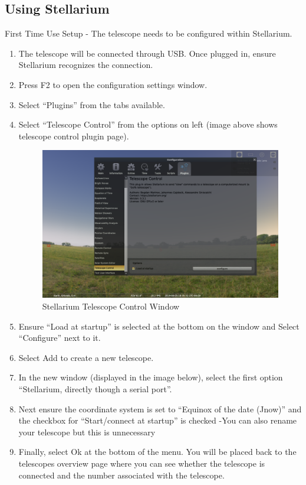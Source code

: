 \documentclass[12pt]{report}
\begin{document}
\subsection{Using Stellarium}

First Time Use Setup - The telescope needs to be configured within Stellarium.
\begin{enumerate}
\item The telescope will be connected through USB. Once plugged in, ensure Stellarium recognizes the connection.
\item Press F2 to open the configuration settings window.
\item Select “Plugins” from the tabs available.
\item Select “Telescope Control” from the options on left (image above shows telescope control plugin page).

\begin{figure}[h]
	\centering
	\includegraphics[width=0.75\linewidth]{stellTeleWindow}
	\caption{Stellarium Telescope Control Window}
  \label{fig:stellTeleWindow}
\end{figure}

\item Ensure “Load at startup” is selected at the bottom on the window and Select “Configure” next to it.
\item Select Add to create a new telescope.
\item In the new window (displayed in the image below), select the first option “Stellarium, directly though a serial port”.
\item Next ensure the coordinate system is set to “Equinox of the date (Jnow)” and the checkbox for “Start/connect at startup” is checked
    -You can also rename your telescope but this is unnecessary
\item Finally, select Ok at the bottom of the menu. You will be placed back to the telescopes overview page where you can see whether the telescope is connected and the number associated with the telescope.


\end{enumerate}
\end{document}
